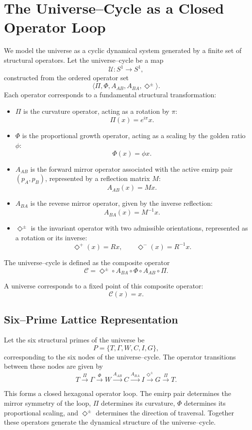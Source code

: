 \section{The Universe--Cycle as a Closed Operator Loop}

We model the universe as a cyclic dynamical system generated by a finite set of
structural operators. Let the universe--cycle be a map
\[
    \mathcal{U} : S^{1} \rightarrow S^{1},
\]
constructed from the ordered operator set
\[
    \langle \Pi, \Phi, A_{AB}, A_{BA}, \Diamond^{\pm} \rangle.
\]
Each operator corresponds to a fundamental structural transformation:

\begin{itemize}
    \item $\Pi$ is the curvature operator, acting as a rotation by $\pi$:
    \[
        \Pi(x) = e^{i\pi} x.
    \]

    \item $\Phi$ is the proportional growth operator, acting as a scaling by the
    golden ratio $\phi$:
    \[
        \Phi(x) = \phi x.
    \]

    \item $A_{AB}$ is the forward mirror operator associated with the active
    emirp pair $(p_{A}, p_{B})$, represented by a reflection matrix $M$:
    \[
        A_{AB}(x) = Mx.
    \]

    \item $A_{BA}$ is the reverse mirror operator, given by the inverse
    reflection:
    \[
        A_{BA}(x) = M^{-1} x.
    \]

    \item $\Diamond^{\pm}$ is the invariant operator with two admissible
    orientations, represented as a rotation or its inverse:
    \[
        \Diamond^{+}(x) = R x, \qquad
        \Diamond^{-}(x) = R^{-1} x.
    \]
\end{itemize}

The universe--cycle is defined as the composite operator
\[
    \mathcal{C}
    = \Diamond^{\pm} \circ A_{BA} \circ \Phi \circ A_{AB} \circ \Pi.
\]

A universe corresponds to a fixed point of this composite operator:
\[
    \mathcal{C}(x) = x.
\]

\subsection{Six--Prime Lattice Representation}

Let the six structural primes of the universe be
\[
    P = \{T, \Gamma, W, C, I, G\},
\]
corresponding to the six nodes of the universe--cycle. The operator transitions
between these nodes are given by
\[
    T \xrightarrow{\Pi} \Gamma
    \xrightarrow{\Phi} W
    \xrightarrow{A_{AB}} C
    \xrightarrow{A_{BA}} I
    \xrightarrow{\Diamond^{\pm}} G
    \xrightarrow{\Pi} T.
\]

This forms a closed hexagonal operator loop. The emirp pair determines the
mirror symmetry of the loop, $\Pi$ determines its curvature, $\Phi$ determines
its proportional scaling, and $\Diamond^{\pm}$ determines the direction of
traversal. Together these operators generate the dynamical structure of the
universe--cycle.
